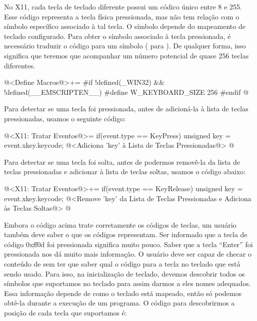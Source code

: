 
No X11, cada tecla de teclado diferente possui um códico único entre 8
e 255. Esse código representa a tecla física pressionada, mas não tem
relação com o símbolo específico associado à tal tecla. O símbolo
depende do mapeamento de teclado configurado. Para obter o símbolo
associado à tecla pressionada, é necessário traduzir o código para um
símbolo ( para ). De qualquer
forma, isso significa que teremos que acompanhar um número potencial
de quase 256 teclas diferentes.

\iniciocodigo
@<Define Macros@>+=
#if !defined(_WIN32) && !defined(__EMSCRIPTEN__)
#define W_KEYBOARD_SIZE 256
#endif
@
\fimcodigo

Para detectar se uma tecla foi pressionada, antes de adicioná-la à
lista de teclas pressionadas, usamos o seguinte código:

\iniciocodigo
@<X11: Tratar Eventos@>=
if(event.type == KeyPress){
  unsigned key = event.xkey.keycode;
  @<Adiciona 'key' à Lista de Teclas Pressionadas@>
}
@
\fimcodigo

Para detectar se uma tecla foi solta, antes de podermos removê-la da
lista de teclas pressionadas e adicionar à lista de teclas soltas,
usamos o código abaixo:

\iniciocodigo
@<X11: Tratar Eventos@>+=
if(event.type == KeyRelease){
  unsigned key = event.xkey.keycode;
  @<Remove 'key' da Lista de Teclas Pressionadas e Adiciona às Teclas Soltas@>
}
@
\fimcodigo

Embora o código acima trate corretamente os códigos de teclas, um
usuário também deve saber o que os códigos representam. Ser informado
que a tecla de código 0xff0d foi pressionada significa muito
pouco. Saber que a tecla ``Enter'' foi pressionada nos dá muito mais
informação. O usuário deve ser capaz de checar o conteúdo
de  sem ter que saber qual o código
para a tecla no teclado que está sendo usado. Para isso, na
inicialização de teclado, devemos descobrir todos os símbolos que
suportamos no teclado para assim darmos a eles nomes adequados. Essa
informação depende de como o teclado está mapeado, então só podemos
obtê-la durante a execução de um programa. O código para descobrirmos
a posição de cada tecla que suportamos é:



